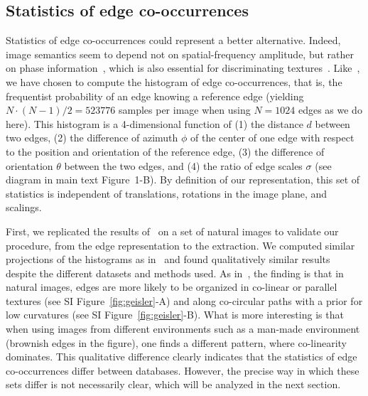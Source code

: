 \documentclass[a4paper]{article}
\begin{document}
\subsection{Statistics of edge co-occurrences}
\label{sec:SO_res}
Statistics of edge co-occurrences could represent a better alternative. 
Indeed, image semantics seem to depend not on spatial-frequency amplitude, 
but rather on phase information~\autocite{Oppenheim81}, 
which is also essential for discriminating textures~\autocite{Motoyoshi10}. 
Like~\textcite{Geisler01}, we have chosen to compute the histogram of edge co-occurrences, 
that is, the frequentist probability of an edge knowing a reference edge 
(yielding $N \cdot (N-1) /2=523776$ samples per image when using $N=1024$ edges as we do here). 
This histogram is a 4-dimensional function of 
(1) the distance $d$ between two edges,
(2) the difference of azimuth $\phi$ of the center of one edge with respect to
the position and orientation of the reference edge, 
(3) the difference of orientation $\theta$ between the two edges, and 
(4) the ratio of edge scales $\sigma$ (see diagram in  main text Figure~1-B). %
By definition of our representation, this set of statistics is independent 
of translations, rotations in the image plane, and scalings. 

First, we replicated the results of~\textcite{Geisler01} 
on a set of natural images to validate our procedure, 
from the edge representation to the extraction. 
We computed similar projections of the histograms as in~\textcite{Geisler01} and
found qualitatively similar results despite the different datasets and methods used. 
As in~\textcite{Geisler01}, the finding is that in natural images, edges are
more likely to be organized in co-linear or parallel textures (see SI Figure~\ref{fig:geisler}-A) 
and along co-circular paths with a prior for low curvatures (see SI Figure~\ref{fig:geisler}-B). 
What is more interesting is that when using images from different environments 
such as a man-made environment (brownish edges in the figure), 
one finds a different pattern, where co-linearity dominates.
This qualitative difference clearly indicates that the statistics of edge co-occurrences 
differ between databases. 
However, the precise way in which these sets differ is not necessarily clear, 
which will be analyzed in the next section. 
\end{document}
